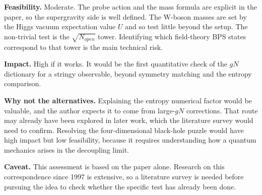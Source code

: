 \documentclass[11pt]{article}
\begin{document}
\textbf{Feasibility.} Moderate. The probe action and the mass formula are explicit in the paper, so the supergravity side is well defined. The W-boson masses are set by the Higgs vacuum expectation value $U$ and so test little beyond the setup. The non-trivial test is the $\sqrt{N_{open}}$ tower. Identifying which field-theory BPS states correspond to that tower is the main technical risk.

\textbf{Impact.} High if it works. It would be the first quantitative check of the $gN$ dictionary for a stringy observable, beyond symmetry matching and the entropy comparison.

\textbf{Why not the alternatives.} Explaining the entropy numerical factor would be valuable, and the author expects it to come from large-$gN$ corrections. That route may already have been explored in later work, which the literature survey would need to confirm. Resolving the four-dimensional black-hole puzzle would have high impact but low feasibility, because it requires understanding how a quantum mechanics arises in the decoupling limit.

\textbf{Caveat.} This assessment is based on the paper alone. Research on this correspondence since 1997 is extensive, so a literature survey is needed before pursuing the idea to check whether the specific test has already been done.
\end{document}
